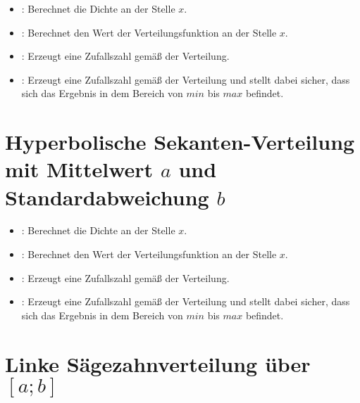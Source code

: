 \begin{itemize}

\item
{}:
Berechnet die Dichte an der Stelle $x$.

\item
{}:
Berechnet den Wert der Verteilungsfunktion an der Stelle $x$.

\item
{}:
Erzeugt eine Zufallszahl gemäß der Verteilung.

\item
{}:
Erzeugt eine Zufallszahl gemäß der Verteilung und stellt dabei sicher, dass sich das Ergebnis in dem Bereich von $min$ bis $max$ befindet.

\end{itemize}



\section{Hyperbolische Sekanten-Verteilung mit Mittelwert \texorpdfstring{$a$}{a} und Standardabweichung \texorpdfstring{$b$}{b}}

\begin{itemize}

\item
{}:
Berechnet die Dichte an der Stelle $x$.

\item
{}:
Berechnet den Wert der Verteilungsfunktion an der Stelle $x$.

\item
{}:
Erzeugt eine Zufallszahl gemäß der Verteilung.

\item
{}:
Erzeugt eine Zufallszahl gemäß der Verteilung und stellt dabei sicher, dass sich das Ergebnis in dem Bereich von $min$ bis $max$ befindet.

\end{itemize}



\section{Linke Sägezahnverteilung über \texorpdfstring{$[a;b]$}{[a;b]}}

